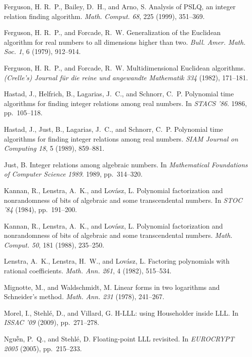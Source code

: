 \documentclass{sig-alternate}
\numberwithin{theorem}{section} \numberwithin{equation}{section}
\begin{document}
\begin{thebibliography}{10}
{\sc Ferguson, H. R.~P., Bailey, D.~H., and Arno, S.}
  Analysis of PSLQ, an integer relation finding algorithm.
  {\em Math. Comput. 68}, 225 (1999), 351--369.

{\sc Ferguson, H. R.~P., and Forcade, R.~W.}
  Generalization of the Euclidean algorithm for real numbers to all
  dimensions higher than two.
  {\em Bull. Amer. Math. Soc. 1}, 6 (1979),
  912--914.

{\sc Ferguson, H. R.~P., and Forcade, R.~W.}
  Multidimensional Euclidean algorithms.
  {\em (Crelle's) Journal f{\"u}r die reine und angewandte Mathematik
  334\/} (1982), 171--181.

{\sc Hastad, J., Helfrich, B., Lagarias, J.~C., and Schnorr, C.~P.}
  Polynomial time algorithms for finding integer relations among real
  numbers.
  In {\em STACS '86}. 1986, pp.~105--118.

{\sc Hastad, J., Just, B., Lagarias, J.~C., and Schnorr, C.~P.}
  Polynomial time algorithms for finding integer relations among real
  numbers.
  {\em SIAM Journal on Computing 18}, 5 (1989), 859--881.

{\sc Just, B.}
  Integer relations among algebraic numbers.
  In {\em Mathematical Foundations of Computer Science 1989}. 1989,
  pp.~314--320.

{\sc Kannan, R., Lenstra, A.~K., and Lov\'{a}sz, L.}
  Polynomial factorization and nonrandomness of bits of algebraic and
  some transcendental numbers.
  In {\em STOC '84\/} (1984), pp.~191--200.

{\sc Kannan, R., Lenstra, A.~K., and Lov{\'a}sz, L.}
  Polynomial factorization and nonrandomness of bits of algebraic and
  some transcendental numbers.
  {\em Math. Comput. 50}, 181 (1988), 235--250.

{\sc Lenstra, A.~K., Lenstra, H.~W., and Lov{\'a}sz, L.}
  Factoring polynomials with rational coefficients.
  {\em Math. Ann. 261}, 4 (1982), 515--534.

{\sc Mignotte, M., and Waldschmidt, M.}
  Linear forms in two logarithms and Schneider's method.
  {\em Math. Ann. 231\/} (1978), 241--267.

{\sc Morel, I., Stehl{\'e}, D., and Villard, G.}
  H-LLL: using Householder inside LLL.
  In {\em ISSAC '09\/} (2009), pp.~271--278.

{\sc Ngu{\~{\^e}}n, P.~Q., and Stehl{\'e}, D.}
  Floating-point LLL revisited.
  In {\em EUROCRYPT 2005\/} (2005), pp.~215--233.


\end{thebibliography}
\end{document}
